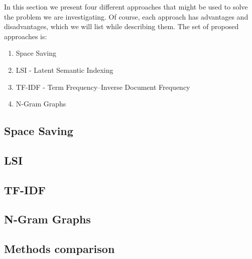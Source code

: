 In this section we present four different approaches that might be used to solve the problem we are investigating. 
Of course, each approach has advantages and disadvantages, which we will list while describing them.
The set of proposed approaches is:
\begin{enumerate}
	\item Space Saving
	\item LSI - Latent Semantic Indexing
	\item TF-IDF - Term Frequency–Inverse Document Frequency
	\item N-Gram Graphs
\end{enumerate}


\subsection{Space Saving}


\subsection{LSI}


\subsection{TF-IDF}


\subsection{N-Gram Graphs}


\subsection*{Methods comparison}

